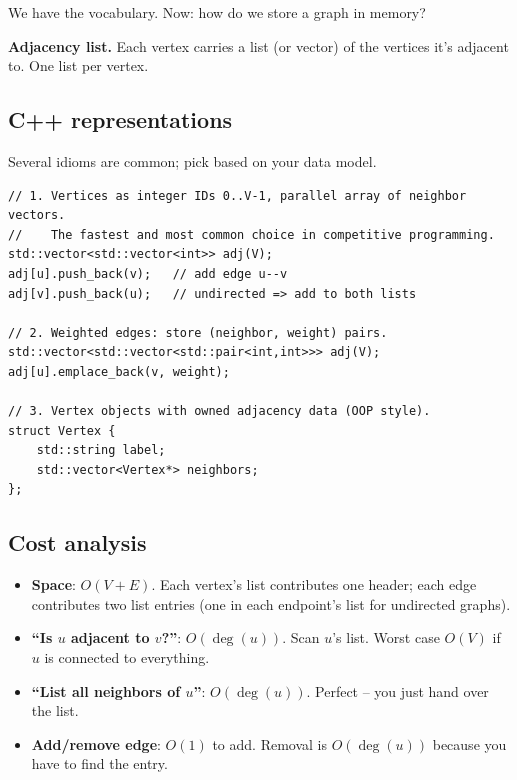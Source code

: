 \documentclass[11pt]{article}
\begin{document}
We have the vocabulary. Now: how do we store a graph in memory?

\begin{defnbox}
\textbf{Adjacency list.} Each vertex carries a list (or vector) of the vertices it's adjacent to. One list per vertex.
\end{defnbox}

\subsection*{C++ representations}

Several idioms are common; pick based on your data model.

\begin{lstlisting}[basicstyle=\ttfamily\small,frame=single]
// 1. Vertices as integer IDs 0..V-1, parallel array of neighbor vectors.
//    The fastest and most common choice in competitive programming.
std::vector<std::vector<int>> adj(V);
adj[u].push_back(v);   // add edge u--v
adj[v].push_back(u);   // undirected => add to both lists

// 2. Weighted edges: store (neighbor, weight) pairs.
std::vector<std::vector<std::pair<int,int>>> adj(V);
adj[u].emplace_back(v, weight);

// 3. Vertex objects with owned adjacency data (OOP style).
struct Vertex {
    std::string label;
    std::vector<Vertex*> neighbors;
};
\end{lstlisting}

\subsection*{Cost analysis}

\begin{itemize}[leftmargin=*]
    \item \textbf{Space}: $O(V + E)$. Each vertex's list contributes one header; each edge contributes two list entries (one in each endpoint's list for undirected graphs).
    \item \textbf{``Is $u$ adjacent to $v$?''}: $O(\deg(u))$. Scan $u$'s list. Worst case $O(V)$ if $u$ is connected to everything.
    \item \textbf{``List all neighbors of $u$''}: $O(\deg(u))$. Perfect -- you just hand over the list.
    \item \textbf{Add/remove edge}: $O(1)$ to add. Removal is $O(\deg(u))$ because you have to find the entry.
\end{itemize}
\end{document}
